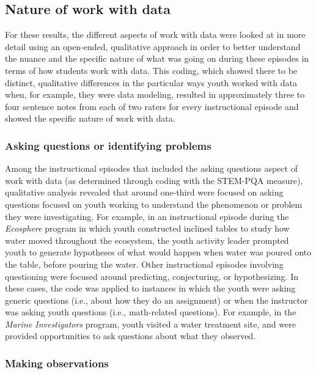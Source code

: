\documentclass[]{msu-thesis}
\theoremstyle{definition}
\theoremstyle{definition}
\theoremstyle{definition}
\theoremstyle{remark}
\begin{document}
\subsection{Nature of work with data}\label{nature-of-work-with-data}

For these results, the different aspects of work with data were looked
at in more detail using an open-ended, qualitative approach in order to
better understand the nuance and the specific nature of what was going
on during these episodes in terms of how students work with data. This
coding, which showed there to be distinct, qualitative differences in
the particular ways youth worked with data when, for example, they were
data modeling, resulted in approximately three to four sentence notes
from each of two raters for every instructional episode and showed the
specific nature of work with data.

\subsubsection{Asking questions or identifying
problems}\label{asking-questions-or-identifying-problems}

Among the instructional episodes that included the asking questions
aspect of work with data (as determined through coding with the STEM-PQA
measure), qualitative analysis revealed that around one-third were
focused on asking questions focused on youth working to understand the
phenomenon or problem they were investigating. For example, in an
instructional episode during the \emph{Ecosphere} program in which youth
constructed inclined tables to study how water moved throughout the
ecosystem, the youth activity leader prompted youth to generate
hypotheses of what would happen when water was poured onto the table,
before pouring the water. Other instructional episodes involving
questioning were focused around predicting, conjecturing, or
hypothesizing. In these cases, the code was applied to instances in
which the youth were asking generic questions (i.e., about how they do
an assignment) or when the instructor was asking youth questions (i.e.,
math-related questions). For example, in the \emph{Marine Investigators}
program, youth visited a water treatment site, and were provided
opportunities to ask questions about what they observed.

\subsubsection{Making observations}\label{making-observations}
\end{document}
